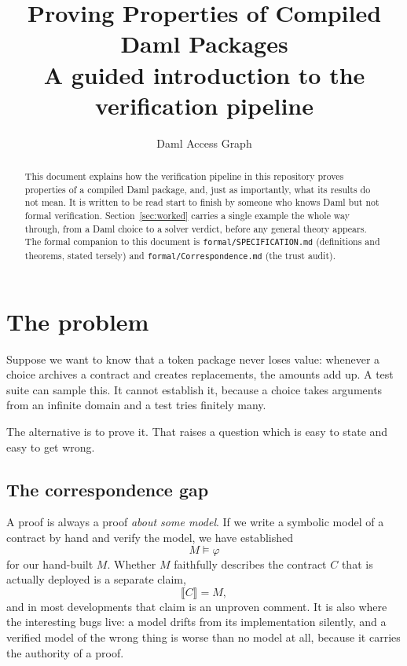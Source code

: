 \documentclass[11pt,a4paper]{article}
\title{\textbf{Proving Properties of Compiled Daml Packages}\\[
  0.35em]\large A guided introduction to the verification pipeline}
\author{Daml Access Graph}
\date{}
\newcommand{\sem}[1]{\llbracket #1 \rrbracket}
\newcommand{\code}[1]{\texttt{#1}}
\theoremstyle{definition}
\theoremstyle{plain}
\theoremstyle{remark}
\begin{document}
\maketitle

\begin{abstract}
\noindent
This document explains how the verification pipeline in this repository proves
properties of a compiled Daml package, and, just as importantly, what its
results do not mean. It is written to be read start to finish by someone who
knows Daml but not formal verification. Section~\ref{sec:worked} carries a
single example the whole way through, from a Daml choice to a solver verdict,
before any general theory appears. The formal companion to this document is
\code{formal/SPECIFICATION.md} (definitions and theorems, stated tersely) and
\code{formal/Correspondence.md} (the trust audit).
\end{abstract}

\tableofcontents
\bigskip

\section{The problem}

Suppose we want to know that a token package never loses value: whenever a
choice archives a contract and creates replacements, the amounts add up. A test
suite can sample this. It cannot establish it, because a choice takes arguments
from an infinite domain and a test tries finitely many.

The alternative is to prove it. That raises a question which is easy to state
and easy to get wrong.

\subsection{The correspondence gap}

A proof is always a proof \emph{about some model}. If we write a symbolic model
of a contract by hand and verify the model, we have established
\[
  M \models \varphi
\]
for our hand-built $M$. Whether $M$ faithfully describes the contract $C$ that
is actually deployed is a separate claim,
\[
  \sem{C} = M,
\]
and in most developments that claim is an unproven comment. It is also where
the interesting bugs live: a model drifts from its implementation silently, and
a verified model of the wrong thing is worse than no model at all, because it
carries the authority of a proof.
\end{document}
